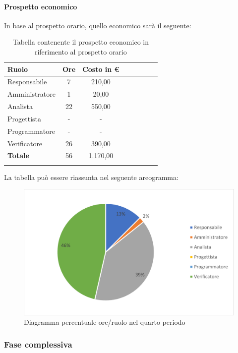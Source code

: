 			\paragraph{Prospetto economico}
			In base al prospetto orario, quello economico sarà il seguente: 
			
			\begin{longtable}{|l|c|c|c|c|c|c|c|}
				\hline
				\rowcolor{lighter-grayer}
				\textbf{Ruolo} & \textbf{Ore} & \textbf{Costo in €} \\
				\hline
				\endfirsthead
				
				\hline
				Responsabile & 7 & 210,00\\
				\hline
				\hline
				Amministratore & 1 & 20,00\\
				\hline
				\hline
				Analista & 22 & 550,00\\
				\hline
				\hline
				Progettista & - & -\\
				\hline
				\hline
				Programmatore & - & -\\
				\hline
				\hline
				Verificatore & 26 & 390,00\\
				\hline
				\textbf{Totale} & 56 & 1.170,00\\
				\hline
				\rowcolor{white}
				\caption{Tabella contenente il prospetto economico in riferimento al prospetto orario}
			\end{longtable}
			\pagebreak
		
			La tabella può essere riassunta nel seguente areogramma:
			\begin{figure}[H]
				\centering
				\includegraphics[width=0.8\linewidth]{res/images/preventivo/dettaglio_analisi/4-2.png}
				\caption{Diagramma percentuale ore/ruolo nel quarto periodo}
				\label{fig:diagramma costi ruolo quarto periodo analisi}
            \end{figure}

	\subsubsection{Fase complessiva}
